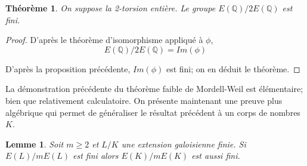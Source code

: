 \documentclass{article}
\newtheorem{theoreme}{Théorème}
\newtheorem{lemme}{Lemme}
\begin{document}
\begin{theoreme}
On suppose la 2-torsion entière. Le groupe $E(\mathbb{Q})/2E(\mathbb{Q})$ est fini.
\end{theoreme}

\begin{proof}
D'après le théorème d'isomorphisme appliqué à $\phi$,
\begin{equation*}
E(\mathbb{Q})/2E(\mathbb{Q}) = Im(\phi)
\end{equation*}

D'après la proposition précédente, $Im(\phi)$ est fini; on en déduit le théorème.
\end{proof}

La démonstration précédente du théorème faible de Mordell-Weil est élémentaire; bien que relativement calculatoire.
On présente maintenant une preuve plus algébrique qui permet de généraliser le résultat précédent à un corps de
nombres $K$.

\begin{lemme}
Soit $m\geq 2$ et $L/K$ une extension galoisienne finie. Si $E(L)/mE(L)$ est fini alors
$E(K)/mE(K)$ est aussi fini.
\end{lemme}
\end{document}
